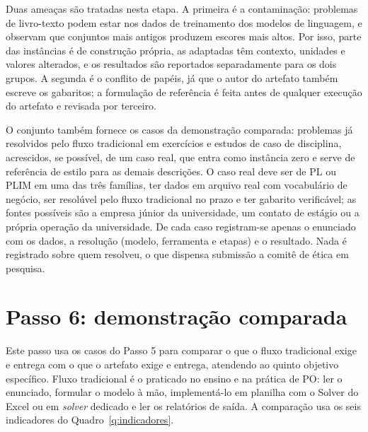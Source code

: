 Duas ameaças são tratadas nesta etapa. A primeira é a contaminação: problemas de livro-texto podem estar nos dados de treinamento dos modelos de linguagem, e  observam que conjuntos mais antigos produzem escores mais altos. Por isso, parte das instâncias é de construção própria, as adaptadas têm contexto, unidades e valores alterados, e os resultados são reportados separadamente para os dois grupos. A segunda é o conflito de papéis, já que o autor do artefato também escreve os gabaritos; a formulação de referência é feita antes de qualquer execução do artefato e revisada por terceiro.

O conjunto também fornece os casos da demonstração comparada: problemas já resolvidos pelo fluxo tradicional em exercícios e estudos de caso de disciplina, acrescidos, se possível, de um caso real, que entra como instância zero e serve de referência de estilo para as demais descrições. O caso real deve ser de PL ou PLIM em uma das três famílias, ter dados em arquivo real com vocabulário de negócio, ser resolúvel pelo fluxo tradicional no prazo e ter gabarito verificável; as fontes possíveis são a empresa júnior da universidade, um contato de estágio ou a própria operação da universidade. De cada caso registram-se apenas o enunciado com os dados, a resolução (modelo, ferramenta e etapas) e o resultado. Nada é registrado sobre quem resolveu, o que dispensa submissão a comitê de ética em pesquisa.

\section{Passo 6: demonstração comparada}
\label{sec:demonstracao}

Este passo usa os casos do Passo 5 para comparar o que o fluxo tradicional exige e entrega com o que o artefato exige e entrega, atendendo ao quinto objetivo específico. Fluxo tradicional é o praticado no ensino e na prática de PO: ler o enunciado, formular o modelo à mão, implementá-lo em planilha com o Solver do Excel ou em \textit{solver} dedicado e ler os relatórios de saída. A comparação usa os seis indicadores do Quadro~\ref{q:indicadores}.

